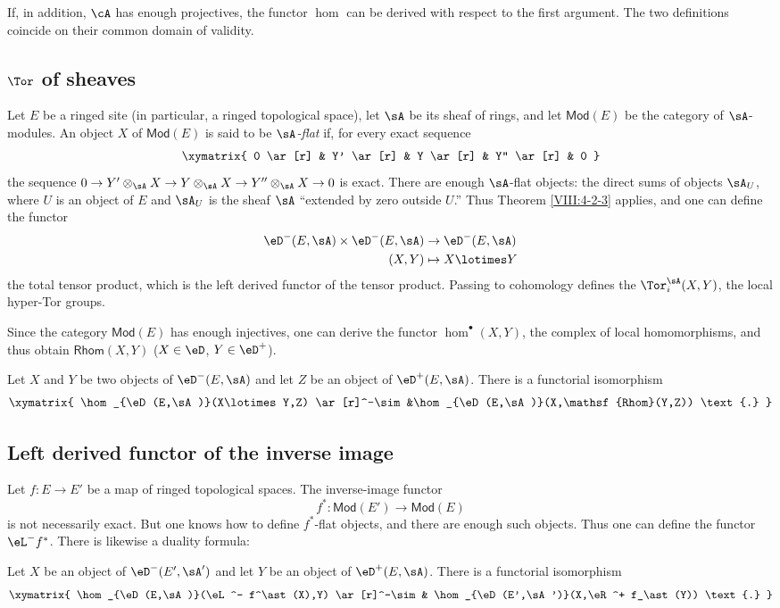\documentclass[oneside]{book}
\begin{document}
If, in addition, $\cA$ has enough projectives, the functor $\hom$ can be
derived with respect to the first argument. The two definitions coincide
on their common domain of validity.

\subsection{\texorpdfstring{$\Tor$}{Tor} of sheaves}\label{VIII:6-2}

Let $E$ be a ringed site (in particular, a ringed topological space), let
$\sA$ be its sheaf of rings, and let $\mathsf{Mod}(E)$ be the category of
$\sA$-modules. An object $X$ of $\mathsf{Mod}(E)$ is said to be
\emph{$\sA$-flat} if, for every exact sequence
\[\xymatrix{
  0 \ar[r]
    & Y' \ar[r]
    & Y \ar[r]
    & Y'' \ar[r]
    & 0
}\]
the sequence
$0 \to Y'\otimes_\sA X \to Y\otimes_\sA X \to Y''\otimes_\sA X\to 0$
is exact. There are enough $\sA$-flat objects: the direct sums of objects
$\sA_U$, where $U$ is an object of $E$ and $\sA_U$ is the sheaf $\sA$
“extended by zero outside $U$.” Thus Theorem \ref{VIII:4-2-3} applies,
and one can define the functor
\begin{align*}
  \eD^-(E,\sA) \times \eD^-(E,\sA) &\to \eD^-(E,\sA) \\
  (X,Y) &\mapsto X\lotimes Y
\end{align*}
the total tensor product, which is the left derived functor of the tensor
product. Passing to cohomology defines the $\Tor_i^\sA(X,Y)$, the local
hyper-Tor groups.

Since the category $\mathsf{Mod}(E)$ has enough injectives, one can derive
the functor $\hom^\bullet(X,Y)$, the complex of local homomorphisms, and
thus obtain $\mathsf{Rhom}(X,Y)$ ($X\in \eD$, $Y\in \eD^+$).

Let $X$ and $Y$ be two objects of $\eD^-(E,\sA)$ and let $Z$ be an object
of $\eD^+(E,\sA)$. There is a functorial isomorphism
\[\xymatrix{
  \hom_{\eD(E,\sA)}(X\lotimes Y,Z) \ar[r]^-\sim
    &\hom_{\eD(E,\sA)}(X,\mathsf{Rhom}(Y,Z)) \text{.}
}\]

\subsection{Left derived functor of the inverse image}\label{VIII:6-3}

Let $f:E\to E'$ be a map of ringed topological spaces. The inverse-image
functor
\[
  f^\ast:\mathsf{Mod}(E') \to \mathsf{Mod}(E)
\]
is not necessarily exact. But one knows how to define $f^\ast$-flat
objects, and there are enough such objects. Thus one can define the
functor $\eL^- f^\ast$. There is likewise a duality formula:

Let $X$ be an object of $\eD^-(E',\sA')$ and let $Y$ be an object of
$\eD^+(E,\sA)$. There is a functorial isomorphism
\[\xymatrix{
  \hom_{\eD(E,\sA)}(\eL^- f^\ast(X),Y) \ar[r]^-\sim
    & \hom_{\eD(E',\sA')}(X,\eR^+ f_\ast(Y)) \text{.}
}\]





\end{document}
